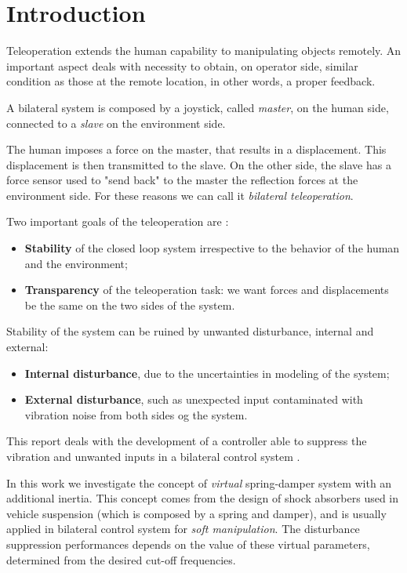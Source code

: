 \section*{Introduction}


Teleoperation extends the human capability to manipulating objects remotely. An important aspect deals with necessity to obtain, on operator side, similar condition as those at the remote location, in other words, a proper feedback. 

A bilateral system is composed by a joystick, called \emph{master}, on the human side, connected to a \emph{slave} on the environment side.

The human imposes a force on the master, that results in a displacement. This displacement is then transmitted to the slave. On the other side, the slave has a force sensor used to "send back" to the master the reflection forces at the environment side. For these reasons we can call it \emph{bilateral teleoperation}.

Two important goals of the teleoperation are \cite{hokayem2006bilateral}:
\begin{itemize}
	\item \textbf{Stability} of the closed loop system irrespective to the behavior of the human and the environment;
	\item \textbf{Transparency} of the teleoperation task: we want forces and displacements be the same on the two sides of the system. 
\end{itemize}

Stability of the system can be ruined by unwanted disturbance, internal and external:
\begin{itemize}
	\item \textbf{Internal disturbance}, due to the uncertainties in modeling of the system;
	\item \textbf{External disturbance}, such as unexpected input contaminated with vibration noise from both sides og the system.
\end{itemize}

This report deals with the development of a controller able to suppress the vibration and unwanted inputs in a bilateral control system \cite{trakarnchaiyo2017vibration}.

In this work we investigate the concept of \textit{virtual} spring-damper system with an additional inertia. This concept comes from the design of shock absorbers used in vehicle suspension (which is composed by a spring and damper), and is usually applied in bilateral control system for \emph{soft manipulation}. The disturbance suppression performances depends on the value of these virtual parameters, determined from the desired cut-off frequencies.


